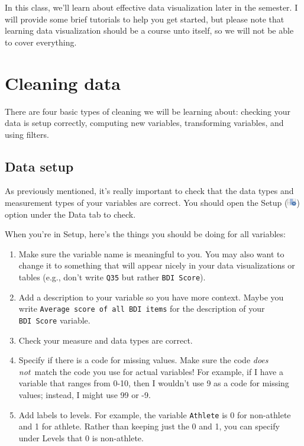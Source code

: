 \documentclass[
]{book}
\begin{document}
In this class, we'll learn about effective data visualization later in the semester. I will provide some brief tutorials to help you get started, but please note that learning data visualization should be a course unto itself, so we will not be able to cover everything.

\hypertarget{cleaning-data}{%
\section{Cleaning data}\label{cleaning-data}}

There are four basic types of cleaning we will be learning about: checking your data is setup correctly, computing new variables, transforming variables, and using filters.

\hypertarget{data-setup}{%
\subsection{Data setup}\label{data-setup}}

As previously mentioned, it's really important to check that the data types and measurement types of your variables are correct. You should open the Setup (\includegraphics[width=0.15625in,height=\textheight]{images/03-jamovi/menu-variable-edit.png}) option under the Data tab to check.

When you're in Setup, here's the things you should be doing for all variables:

\begin{enumerate}
\def\labelenumi{\arabic{enumi}.}
\item
  Make sure the variable name is meaningful to you. You may also want to change it to something that will appear nicely in your data visualizations or tables (e.g., don't write \texttt{Q35} but rather \texttt{BDI\ Score}).
\item
  Add a description to your variable so you have more context. Maybe you write \texttt{Average\ score\ of\ all\ BDI\ items} for the description of your \texttt{BDI\ Score} variable.
\item
  Check your measure and data types are correct.
\item
  Specify if there is a code for missing values. Make sure the code \emph{does not}~match the code you use for actual variables! For example, if I have a variable that ranges from 0-10, then I wouldn't use 9 as a code for missing values; instead, I might use 99 or -9.
\item
  Add labels to levels. For example, the variable \texttt{Athlete} is 0 for non-athlete and 1 for athlete. Rather than keeping just the 0 and 1, you can specify under Levels that 0 is non-athlete.
\end{enumerate}
\end{document}
